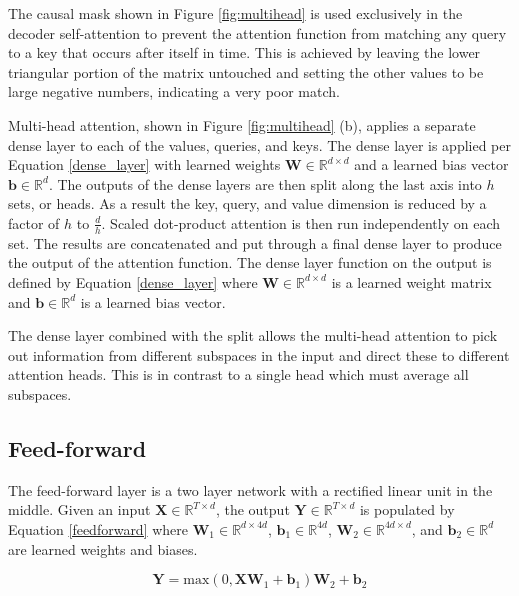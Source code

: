 The causal mask shown in Figure \ref{fig:multihead} is used exclusively in the decoder self-attention to prevent the attention function from matching any query to a key that occurs after itself in time.
This is achieved by leaving the lower triangular portion of the matrix untouched and setting the other values to be large negative numbers, indicating a very poor match.

Multi-head attention, shown in Figure \ref{fig:multihead} (b), applies a separate dense layer to each of the values, queries, and keys. 
The dense layer is applied per Equation \ref{dense_layer} with learned weights $\boldsymbol{W} \in \mathbb{R}^{d \times d}$ and a learned bias vector $\boldsymbol{b} \in \mathbb{R}^{d}$.
The outputs of the dense layers are then split along the last axis into $h$ sets, or heads.
As a result the key, query, and value dimension is reduced by a factor of $h$ to $\frac{d}{h}$.
Scaled dot-product attention is then run independently on each set.
The results are concatenated and put through a final dense layer to produce the output of the attention function.
The dense layer function on the output is defined by Equation \ref{dense_layer} where $\boldsymbol{W} \in \mathbb{R}^{d \times d}$ is a learned weight matrix and $\boldsymbol{b} \in \mathbb{R}^{d}$ is a learned bias vector.

The dense layer combined with the split allows the multi-head attention to pick out information from different subspaces in the input and direct these to different attention heads.
This is in contrast to a single head which must average all subspaces.

\subsection{Feed-forward}
The feed-forward layer is a two layer network with a rectified linear unit in the middle.
Given an input $\boldsymbol{X} \in \mathbb{R}^{T \times d}$, the output $\boldsymbol{Y} \in \mathbb{R}^{T \times d}$ is populated by Equation \ref{feedforward} where $\boldsymbol{W}_1 \in \mathbb{R}^{d \times 4d}$, $\boldsymbol{b}_1 \in \mathbb{R}^{4d}$, $\boldsymbol{W}_2 \in \mathbb{R}^{4d \times d}$, and $\boldsymbol{b}_2 \in \mathbb{R}^{d}$ are learned weights and biases.

\begin{equation} \label{feedforward}
\boldsymbol{Y} = \text{max}(0, \boldsymbol{X}  \boldsymbol{W}_1 + \boldsymbol{b}_1)  \boldsymbol{W}_2 + \boldsymbol{b}_2
\end{equation}

